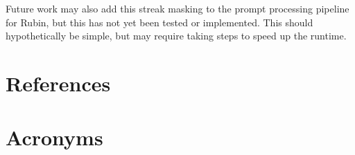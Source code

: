 \documentclass[DM,authoryear,toc]{lsstdoc}
\begin{document}
Future work may also add this streak masking to the prompt processing pipeline for Rubin, but this has not yet been tested or implemented. This should hypothetically be simple, but may require taking steps to speed up the runtime.

\section{References} \label{sec:bib}
\renewcommand{\refname}{} %


\section{Acronyms} \label{sec:acronyms}

\end{document}
